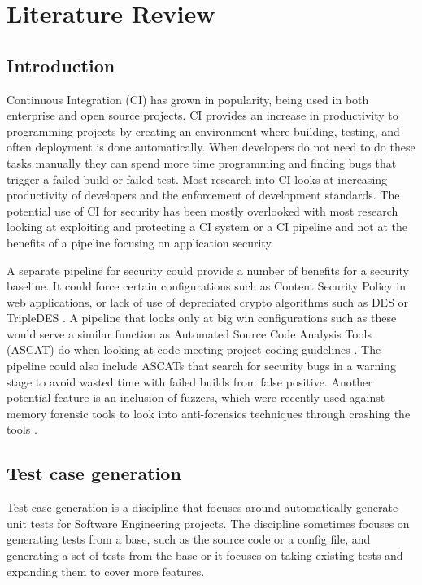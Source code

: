 \section{Literature Review}

\subsection{Introduction}
    Continuous Integration (CI) has grown in popularity, being used in both enterprise and open source projects. CI provides an increase in productivity to programming projects by creating an 
    environment where building, testing, and often deployment is done automatically. When developers do not need to do these tasks manually they can spend more time programming and finding bugs that 
    trigger a failed build or failed test. Most research into CI looks at increasing productivity of developers and the enforcement of development standards. The potential use of CI for security has 
    been mostly overlooked with most research looking at exploiting and protecting a CI system or a CI pipeline and not at the benefits of a pipeline focusing on application security.

	A separate pipeline for security could provide a number of benefits for a security baseline. It could force certain configurations such as Content Security Policy in web applications, or lack of 
    use of depreciated crypto algorithms such as DES or TripleDES \cite{Vehent}. A pipeline that looks only at big win configurations such as these would serve a similar function as Automated Source 
    Code Analysis Tools (ASCAT) do when looking at code meeting project coding guidelines \cite{Zampetti}. The pipeline could also include ASCATs that search for security bugs in a warning stage to 
    avoid wasted time with failed builds from false positive. Another potential feature is an inclusion of fuzzers, which were recently used against memory forensic tools to look into anti-forensics 
    techniques through crashing the tools \cite{Case}.

\subsection{Test case generation}
    Test case generation is a discipline that focuses around automatically generate unit tests for Software Engineering projects. The discipline sometimes focuses on generating tests from a base,
    such as the source code or a config file, and generating a set of tests from the base or it focuses on taking existing tests and expanding them to cover more features.

